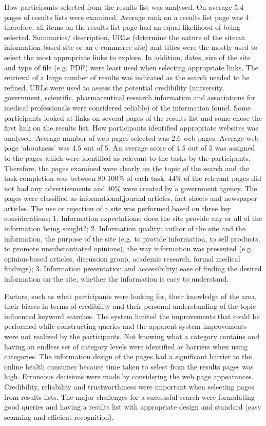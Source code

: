 \documentclass[]{article}
\begin{document}
How participants selected from the results list was analysed. On average 5.4 pages of results lists were examined. Average rank on a results list page was 4 therefore, all items on the results list page had an equal likelihood of being selected. Summaries/ description, URLs (determine the nature of the site:an information-based site or an e-commerce site) and titles were the mostly used to select the most appropriate links to explore. In addition, dates, size of the site and type of file (e.g. PDF) were least used when selecting appropriate links. The retrieval of a large number of results was indicated as the search needed to be refined. URLs were used to  assess the potential credibility (university, government, scientific, pharmaceutical research information and associations for medical professionals were considered reliable) of the information found. Some participants looked at links on several pages of the results list and some chose the first link on the results list. How participants identified appropriate websites was analysed. Average number of web pages selected was 2.6 web pages. Average web page ‘aboutness’ was 4.5 out of 5. An average score of 4.5 out of 5 was assigned to the pages which were identified as relevant to the tasks by the participants. Therefore, the pages examined were clearly on the topic of the search and the task completion was between 80-100\% of each task. 44\% of the relevant pages did not had any advertisements and 40\% were created by a government agency. The pages were classified as informational,journal articles, fact sheets and newspaper articles. The use or rejection of a site was performed based on three key considerations; 1. Information expectations: does the site provide any or all of the information being sought?; 2. Information quality: author of the site and the information, the purpose of the site (e.g. to provide information, to sell products, to promote unsubstantiated opinions), the way information was presented (e.g. opinion-based articles, discussion group, academic research, formal medical findings); 3. Information presentation and accessibility: ease of finding the desired information on the site, whether the information is easy to understand. 

Factors, such as what participants were looking for, their knowledge of the area, their biases in terms of credibility and their personal understanding of the topic influenced keyword searches. The system limited the improvements that could be performed while constructing queries and the apparent system improvements were not realized by the participants. Not knowing what a category contains and having an endless set of category levels were identified as barriers when using categories. The information design of the pages had a significant barrier to the online health consumer because time taken to select from the results pages was high. Erroneous decisions were made by considering the web page appearances. Credibility, reliability and trustworthiness were important when selecting pages from results lists. The major challenges for a successful search were formulating good queries and having a results list with appropriate design and standard (easy scanning and efficient recognition).  
\end{document}
